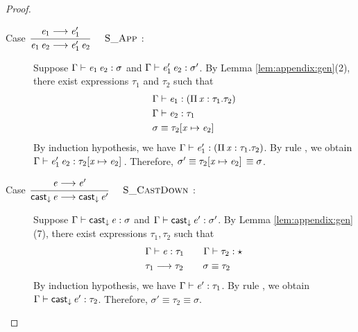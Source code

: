 \begin{proof}
\begin{description}
        \item[Case ${\displaystyle\frac{\begin{array}{l} {\mathit{e_{{\mathrm{1}}}} \longrightarrow \mathit{e'_{{\mathrm{1}}}}} \end{array}}{ \mathit{e_{{\mathrm{1}}}} \, \mathit{e_{{\mathrm{2}}}} \longrightarrow \mathit{e'_{{\mathrm{1}}}} \, \mathit{e_{{\mathrm{2}}}}}\quad\textsc{ {\textsc{S\_App}}{} }}$:] $\quad$ \\
        Suppose $\Gamma  \vdash  \mathit{e_{{\mathrm{1}}}} \, \mathit{e_{{\mathrm{2}}}}  :  \sigma$ and $\Gamma  \vdash  \mathit{e'_{{\mathrm{1}}}} \, \mathit{e_{{\mathrm{2}}}}  :  \sigma'$. By Lemma \ref{lem:appendix:gen}(2), there exist expressions $\tau_{{\mathrm{1}}}$ and $\tau_{{\mathrm{2}}}$ such that 
        \begin{align*}
            &\Gamma  \vdash  \mathit{e_{{\mathrm{1}}}}  :  (  \Pi \, \mathit{x}  :  \tau_{{\mathrm{1}}}  .  \tau_{{\mathrm{2}}}  ) \\
            &\Gamma  \vdash  \mathit{e_{{\mathrm{2}}}}  :  \tau_{{\mathrm{1}}}\\
            &\sigma  \equiv  \tau_{{\mathrm{2}}}  [  \mathit{x}  \mapsto  \mathit{e_{{\mathrm{2}}}}  ] \,
        \end{align*}
        By induction hypothesis, we have $\Gamma  \vdash  \mathit{e'_{{\mathrm{1}}}}  :  (  \Pi \, \mathit{x}  :  \tau_{{\mathrm{1}}}  .  \tau_{{\mathrm{2}}}  )$. By rule , we obtain $\Gamma  \vdash  \mathit{e'_{{\mathrm{1}}}} \, \mathit{e_{{\mathrm{2}}}}  :  \tau_{{\mathrm{2}}}  [  \mathit{x}  \mapsto  \mathit{e_{{\mathrm{2}}}}  ] \,$. Therefore, $\sigma'  \equiv  \tau_{{\mathrm{2}}}  [  \mathit{x}  \mapsto  \mathit{e_{{\mathrm{2}}}}  ] \,  \equiv  \sigma$.
        
        \item[Case ${\displaystyle\frac{\begin{array}{l} {\mathit{e} \longrightarrow \mathit{e'}} \end{array}}{ \mathsf{cast}_{\downarrow} \, \mathit{e} \longrightarrow \mathsf{cast}_{\downarrow} \, \mathit{e'}}\quad\textsc{ {\textsc{S\_CastDown}}{} }}$:] $\quad$ \\
        Suppose $\Gamma  \vdash  \mathsf{cast}_{\downarrow} \, \mathit{e}  :  \sigma$ and $\Gamma  \vdash  \mathsf{cast}_{\downarrow} \, \mathit{e'}  :  \sigma'$. By Lemma \ref{lem:appendix:gen}(7), there exist expressions $\tau_{{\mathrm{1}}}, \tau_{{\mathrm{2}}}$ such that 
        \begin{align*}
            &\Gamma  \vdash  \mathit{e}  :  \tau_{{\mathrm{1}}} \qquad \Gamma  \vdash  \tau_{{\mathrm{2}}}  :  \star \\
            &\tau_{{\mathrm{1}}}  \longrightarrow  \tau_{{\mathrm{2}}} \qquad \sigma  \equiv  \tau_{{\mathrm{2}}}
        \end{align*}
        By induction hypothesis, we have $\Gamma  \vdash  \mathit{e'}  :  \tau_{{\mathrm{1}}}$. By rule , we obtain $\Gamma  \vdash  \mathsf{cast}_{\downarrow} \, \mathit{e'}  :  \tau_{{\mathrm{2}}}$. Therefore, $\sigma'  \equiv  \tau_{{\mathrm{2}}}  \equiv  \sigma$.
        

\end{description}
\end{proof}
